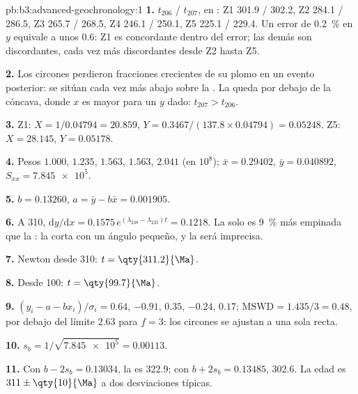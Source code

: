 \begin{solution}{pb:b3:advanced-geochronology:1}
\textbf{1.} $t_{206}$ / $t_{207}$, en \unit{\Ma}: Z1 301.9 / 302.2, Z2 284.1 /
286.5, Z3 265.7 / 268.5, Z4 246.1 / 250.1, Z5 225.1 / 229.4. Un error de
\qty{0.2}{\percent} en $y$ equivale a unos \qty{0.6}{\Ma}: Z1 es concordante dentro del
error; las demás son discordantes, cada vez más discordantes desde Z2 hasta Z5.

\textbf{2.} Los circones perdieron fracciones crecientes de su plomo en un
evento posterior: se sitúan cada vez más abajo sobre la . La  queda por debajo de la
 cóncava, donde $x$ es mayor para un $y$ dado: $t_{207} > t_{206}$.

\textbf{3.} Z1: $X = 1/0.04794 = 20.859$, $Y = 0.3467/(137.8\times0.04794) =
0.05248$. Z5: $X = 28.145$, $Y = 0.05178$.

\textbf{4.} Pesos $1.000$, $1.235$, $1.563$, $1.563$, $2.041$ (en
$10^8$); $\bar x = 0.29402$, $\bar y = 0.040892$, $S_{xx} = \num{7.845e5}$.

\textbf{5.} $b = 0.13260$, $a = \bar y - b\bar x = 0.001905$.

\textbf{6.} A \qty{310}{\Ma}, $\mathrm dy/\mathrm dx = 0.1575\,
e^{(\lambda_{238} - \lambda_{235})t} = 0.1218$. La  solo es
\qty{9}{\percent} más empinada que la : la corta con un ángulo pequeño,
y la  será imprecisa.

\textbf{7.} Newton desde \qty{310}{\Ma}: $t = \qty{311.2}{\Ma}$.

\textbf{8.} Desde \qty{100}{\Ma}: $t = \qty{99.7}{\Ma}$.

\textbf{9.} $(y_i - a - bx_i)/\sigma_i = 0.64$, $-0.91$, $0.35$, $-0.24$,
$0.17$; $\mathrm{MSWD} = 1.435/3 = 0.48$, por debajo del límite $2.63$ para $f = 3$:
los circones se ajustan a una sola recta.

\textbf{10.} $s_b = 1/\sqrt{\num{7.845e5}} = 0.00113$.

\textbf{11.} Con $b - 2s_b = 0.13034$, la  es
\qty{322.9}{\Ma}; con $b + 2s_b = 0.13485$, \qty{302.6}{\Ma}. La edad es
$311 \pm \qty{10}{\Ma}$ a dos desviaciones típicas.


\end{solution}

